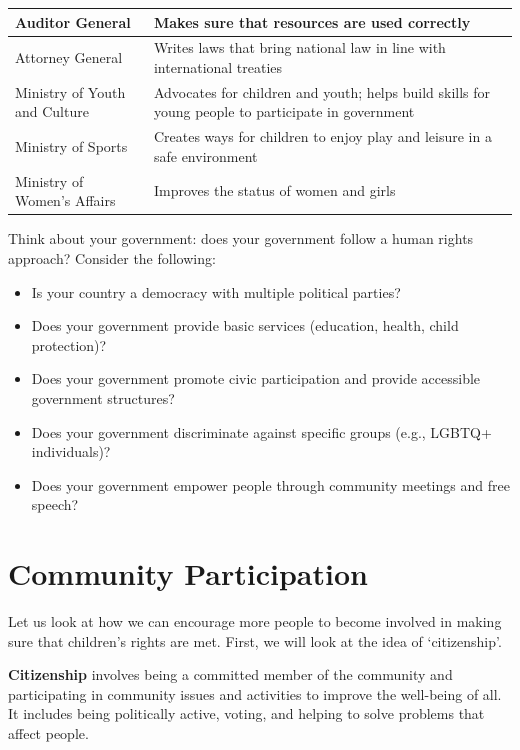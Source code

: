 \documentclass[12pt,a4paper]{article}
\begin{document}
\begin{table}[h!]
\begin{tabular}{|p{4.5cm}|p{8.5cm}|}
        Auditor General & Makes sure that resources are used correctly \\ \hline
        Attorney General & Writes laws that bring national law in line with international treaties \\ \hline
        Ministry of Youth and Culture & Advocates for children and youth; helps build skills for young people to participate in government \\ \hline
        Ministry of Sports & Creates ways for children to enjoy play and leisure in a safe environment \\ \hline
        Ministry of Women's Affairs & Improves the status of women and girls \\ \hline
    \end{tabular}
\end{table}

\begin{tcolorbox}[colback=blue!5,colframe=blue!75!black,title=Learning Activity 4.1: Your Government’s Approach]
Think about your government: does your government follow a human rights approach? Consider the following:
\begin{itemize}
    \item Is your country a democracy with multiple political parties?
    \item Does your government provide basic services (education, health, child protection)?
    \item Does your government promote civic participation and provide accessible government structures?
    \item Does your government discriminate against specific groups (e.g., LGBTQ+ individuals)?
    \item Does your government empower people through community meetings and free speech?
\end{itemize}
\end{tcolorbox}

\section*{Community Participation}
Let us look at how we can encourage more people to become involved in making sure that children’s rights are met. First, we will look at the idea of ‘citizenship’.

\textbf{Citizenship} involves being a committed member of the community and participating in community issues and activities to improve the well-being of all. It includes being politically active, voting, and helping to solve problems that affect people.
\end{document}
